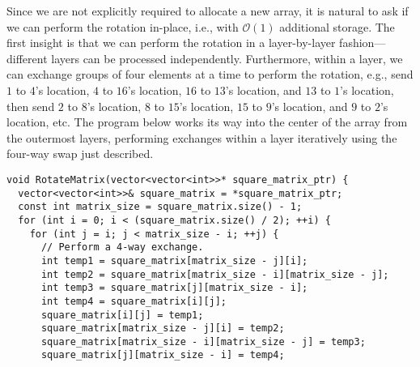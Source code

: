 \documentclass[10pt,openany,twoside,letterpaper,extrafontsizes]{memoir}
\newif\ifCpp
\newcommand{\myindex}[1]{%
\index[terms]{#1}%
}
\begin{document}
\begin{Spacing}{\arraysSpacing}
Since we are not explicitly required to allocate a new array, it is natural to ask if we can perform
the rotation in-place, i.e., with $\mathcal{O}(1)$ additional storage.
The first insight is that we can perform the rotation in a layer-by-layer fashion---different
layers can be processed independently. Furthermore, within a layer,
we can exchange groups of four elements at a time to
perform the rotation, e.g., send $1$ to $4$'s location, $4$ to $16$'s location,
$16$ to $13$'s location, and $13$ to $1$'s location, then
send $2$ to $8$'s location, $8$ to $15$'s location,
$15$ to $9$'s location, and $9$ to $2$'s location, etc.
The program below works its way into the center of the array
from the outermost layers, performing  exchanges within a layer iteratively using the four-way
swap just described.
\ifCpp
\begin{lstlisting}[language={[11]C++}]
void RotateMatrix(vector<vector<int>>* square_matrix_ptr) {
  vector<vector<int>>& square_matrix = *square_matrix_ptr;
  const int matrix_size = square_matrix.size() - 1;
  for (int i = 0; i < (square_matrix.size() / 2); ++i) {
    for (int j = i; j < matrix_size - i; ++j) {
      // Perform a 4-way exchange.
      int temp1 = square_matrix[matrix_size - j][i];
      int temp2 = square_matrix[matrix_size - i][matrix_size - j];
      int temp3 = square_matrix[j][matrix_size - i];
      int temp4 = square_matrix[i][j];
      square_matrix[i][j] = temp1;
      square_matrix[matrix_size - j][i] = temp2;
      square_matrix[matrix_size - i][matrix_size - j] = temp3;
      square_matrix[j][matrix_size - i] = temp4;

\end{lstlisting}
\end{Spacing}
\end{document}
